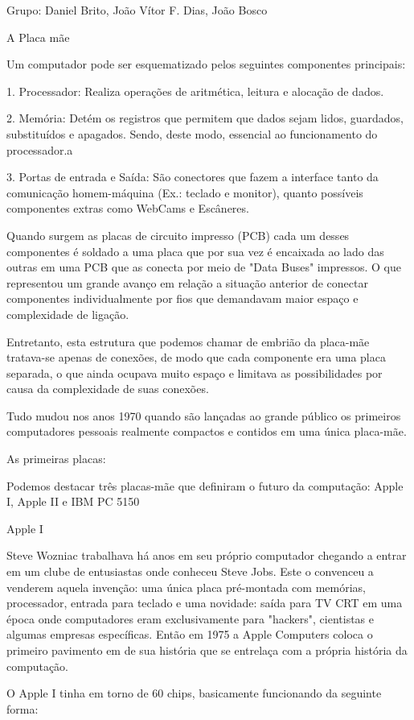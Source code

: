 \documentclass[a4paper,10pt]{article}
\begin{document}
Grupo: Daniel Brito, João Vítor F. Dias, João Bosco

A Placa mãe

Um computador pode ser esquematizado pelos seguintes componentes principais:

1. Processador: Realiza operações de aritmética, leitura e alocação de dados.

2. Memória: Detém os registros que permitem que dados sejam lidos, guardados, substituídos e apagados. Sendo, deste modo, essencial ao funcionamento do processador.a

3. Portas de entrada e Saída: São conectores que fazem a interface tanto da comunicação homem-máquina (Ex.: teclado e monitor), quanto possíveis componentes extras como WebCams e Escâneres.

Quando surgem as placas de circuito impresso (PCB) cada um desses componentes é soldado a uma placa que por sua vez é encaixada ao lado das outras em uma PCB que as conecta por meio de "Data Buses" impressos. O que representou um grande avanço em relação a situação anterior de conectar componentes individualmente por fios que demandavam maior espaço e complexidade de ligação.

Entretanto, esta estrutura que podemos chamar de embrião da placa-mãe tratava-se apenas de conexões, de modo que cada componente era uma placa separada, o que ainda ocupava muito espaço e limitava as possibilidades por causa da complexidade de suas conexões.

Tudo mudou nos anos 1970 quando são lançadas ao grande público os primeiros computadores pessoais realmente compactos e contidos em uma única placa-mãe.

As primeiras placas:

Podemos destacar três placas-mãe que definiram o futuro da computação: Apple I, Apple II e IBM PC 5150

Apple I

Steve Wozniac trabalhava há anos em seu próprio computador chegando a entrar em um clube de entusiastas onde conheceu Steve Jobs. Este o convenceu a venderem aquela invenção: uma única placa pré-montada com memórias, processador, entrada para teclado e uma novidade: saída para TV CRT em uma época onde computadores eram exclusivamente para "hackers", cientistas e algumas empresas específicas. Então em 1975 a Apple Computers coloca o primeiro pavimento em de sua história que se entrelaça com a própria história da computação.

O Apple I tinha em torno de 60 chips, basicamente funcionando da seguinte forma:
\end{document}
